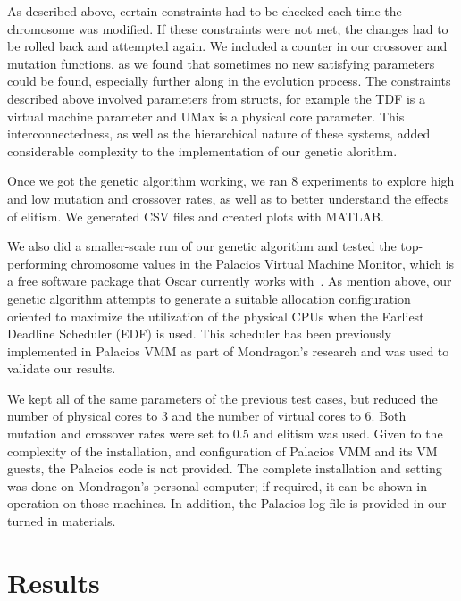 \documentclass[11pt]{article}
\begin{document}
As described above, certain constraints had to be checked each time the chromosome was modified. If these constraints were not met, the changes had to be rolled back and attempted again. We included a counter in our crossover and mutation functions, as we found that sometimes no new satisfying parameters could be found, especially further along in the evolution process. The constraints described above involved parameters from structs, for example the TDF is a virtual machine parameter and UMax is a physical core parameter. This interconnectedness, as well as the hierarchical nature of these systems, added considerable complexity to the implementation of our genetic alorithm. 

Once we got the genetic algorithm working, we ran 8 experiments to explore high and low mutation and crossover rates, as well as to better understand the effects of elitism. We generated CSV files and created plots with MATLAB. 

We also did a smaller-scale run of our genetic algorithm and tested the top-performing chromosome values in the Palacios Virtual Machine Monitor, which is a free software package that Oscar currently works with~\cite{Mondragon:13}. As mention above, our genetic algorithm attempts to generate a suitable allocation configuration oriented to maximize the utilization of the physical CPUs when the Earliest Deadline Scheduler (EDF) is used. This scheduler has been previously implemented in Palacios VMM as part of Mondragon's research and was used to validate our results.

We kept all of the same parameters of the previous test cases, but reduced the number of physical cores to 3 and the number of virtual cores to 6. Both mutation and crossover rates were set to 0.5 and elitism was used. Given to the complexity of the installation, and configuration of Palacios VMM and its VM guests, the Palacios code is not provided. The complete installation and setting was done on Mondragon's personal computer; if required, it can be shown in operation on those machines. In addition, the Palacios log file is provided in our turned in materials.

\section{Results}
\end{document}
